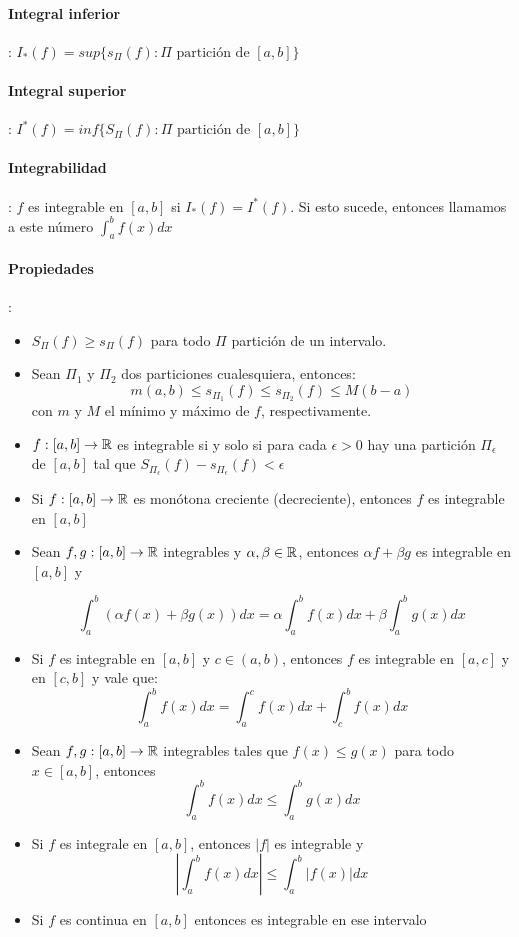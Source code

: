 \paragraph{Integral inferior}: $I_{*}(f) = sup\{s_\Pi(f): \Pi \text{ partición de } [a,b]\}$

\paragraph{Integral superior}: $I^{*}(f) = inf\{S_\Pi(f): \Pi \text{ partición de } [a,b]\}$

\paragraph{Integrabilidad}: $f$ es integrable en $[a,b]$ si $I_{*}(f) = I^{*}(f)$. Si esto sucede, entonces llamamos a este número $\int_a^b f(x)dx$
\paragraph{Propiedades}:
\begin{itemize}
    \item $S_\Pi(f) \geq s_\Pi(f)$ para todo $\Pi$ partición de un intervalo.
    \item Sean $\Pi_1$ y $\Pi_2$ dos particiones cualesquiera, entonces:
    $$ m(a,b) \leq s_{\Pi_1}(f) \leq s_{\Pi_2}(f) \leq M(b-a)$$ con $m$ y $M$ el mínimo y máximo de $f$, respectivamente.
    \item $f:[a,b]\to\mathbb{R}$ es integrable si y solo si para cada $\epsilon > 0$ hay una partición $\Pi_\epsilon$ de $[a,b]$ tal que $S_{\Pi_\epsilon}(f) - s_{\Pi_\epsilon}(f) < \epsilon$
    
    \item Si $f:[a,b]\to\mathbb{R}$ es monótona creciente (decreciente), entonces $f$ es integrable en $[a,b]$
    
    \item Sean $f,g:[a,b]\to\mathbb{R}$ integrables y $\alpha,\beta\in\mathbb{R}$, entonces $\alpha f + \beta g$ es integrable en $[a,b]$ y
    
    $$\int_a^b (\alpha f(x) + \beta g(x))dx = \alpha\int_a^b f(x)dx + \beta\int_a^b g(x)dx$$
    
    \item Si $f$ es integrable en $[a,b]$ y $c\in (a,b)$, entonces $f$ es integrable en $[a,c]$ y en $[c,b]$ y vale que:
    $$\int_a^b f(x)dx = \int_a^c f(x)dx + \int_c^b f(x)dx$$
    
    \item Sean $f,g:[a,b]\to\mathbb{R}$ integrables tales que $f(x) \leq g(x)$ para todo $x\in[a,b]$, entonces
    $$\int_a^b f(x)dx \leq \int_a^b g(x)dx$$
    
    \item Si $f$ es integrale en $[a,b]$, entonces $|f|$ es integrable y
    $$\left|\int_a^b f(x)dx\right| \leq \int_a^b\left|f(x)\right|dx$$
    
    \item Si $f$ es continua en $[a,b]$ entonces es integrable en ese intervalo
\end{itemize}

